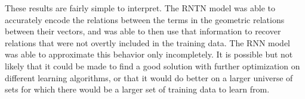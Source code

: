 
These results are fairly simple to interpret. The RNTN model was able to accurately encode the relations between the terms in the geometric relations between their vectors, and was able to then use that information to recover relations that were not overtly included in the training data. The RNN model was able to approximate this behavior only incompletely. It is possible but not likely that it could be made to find a good solution with further optimization on different learning algorithms, or that it would do better on a larger universe of sets for which there would be a larger set of training data to learn from.

